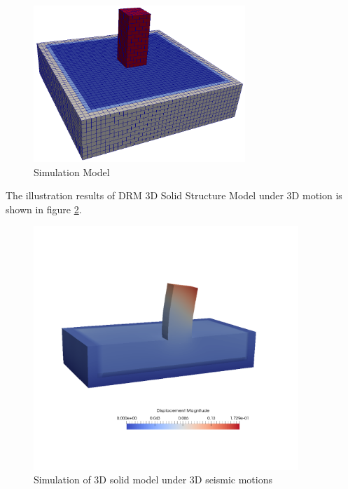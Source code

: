 \begin{figure}[H]
  \centering
  \includegraphics[width = 8cm]{./Figure-files/Day2/Apply_3D_Motions_from_SW4/Earthquake_Soil-Structure_Interaction_3D_Model_with_DRM/overview.png}
  \caption{Simulation Model}
  \label{fig_decon_1D_motion_3D_model6}
\end{figure}


The illustration results of DRM 3D Solid Structure Model  under 3D motion is shown in figure \ref{3D_solid_model_3D_seismic_motion}. 

\begin{figure}[H]
  \centering
  \includegraphics[width = 10cm]{./Figure-files/Day2/Apply_3D_Motions_from_SW4/Earthquake_Soil-Structure_Interaction_3D_Model_with_DRM/3D_solid_model_3D_motion.pdf}
  \caption{Simulation of 3D solid model under 3D seismic motions}
  \label{3D_solid_model_3D_seismic_motion}
\end{figure}




\clearpage
\newpage

